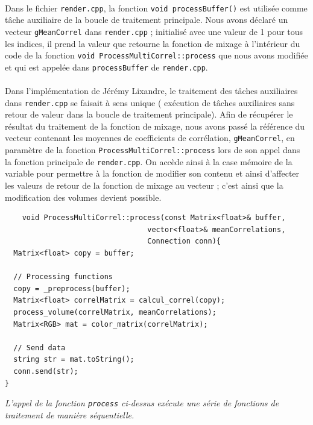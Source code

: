  \paragraph{}
 Dans le fichier \verb!render.cpp!, la fonction
 \verb!void processBuffer()! est utilisée comme tâche auxiliaire de la
 boucle de traitement principale. Nous avons déclaré un vecteur
 \verb!gMeanCorrel! dans \verb!render.cpp! ; initialisé avec une valeur
 de 1 pour tous les indices, il prend la valeur que retourne la
 fonction de mixage à l'intérieur du code de la fonction
 \verb!void ProcessMultiCorrel::process!
 que nous avons modifiée et qui est appelée dans \verb!processBuffer!
 de \verb!render.cpp!.
 \paragraph{}
 Dans l'implémentation de Jérémy Lixandre, le traitement des tâches
 auxiliaires dans \verb!render.cpp! se faisait à sens unique (
 exécution de tâches auxiliaires sans retour de valeur dans la boucle
 de traitement principale). Afin de récupérer le résultat du
 traitement de la fonction de mixage, nous avons passé la référence du
 vecteur contenant les moyennes de coefficients de corrélation,
 \verb!gMeanCorrel!, en paramètre de la fonction
 \verb!ProcessMultiCorrel::process! lors de son appel dans la fonction
 principale de \verb!render.cpp!. On accède ainsi à la case mémoire de
 la variable pour permettre à la fonction de modifier son contenu et
 ainsi d'affecter les valeurs de retour de la fonction de mixage au
 vecteur ; c'est ainsi que la modification des volumes devient
 possible.

 \begin{lstlisting}
    void ProcessMultiCorrel::process(const Matrix<float>& buffer,
                                 vector<float>& meanCorrelations,
                                 Connection conn){
  Matrix<float> copy = buffer;

  // Processing functions
  copy = _preprocess(buffer);
  Matrix<float> correlMatrix = calcul_correl(copy);
  process_volume(correlMatrix, meanCorrelations);
  Matrix<RGB> mat = color_matrix(correlMatrix);

  // Send data
  string str = mat.toString();
  conn.send(str);
}
 \end{lstlisting}
 \begin{center}
  \textit{L'appel de la fonction \verb!process! ci-dessus exécute une série de fonctions de traitement de manière séquentielle.}
 \end{center}

